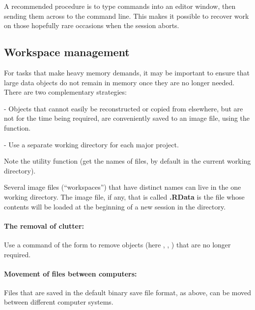 A recommended procedure
is to type commands into an editor window,
then sending them across to the command line. This makes it possible
to recover work on those hopefully rare occasions when the
session aborts.

\subsection{Workspace management}

For tasks that make heavy memory demands, it may be important to
ensure that large data objects do not remain in memory once they are
no longer needed. There are two complementary strategies:
\begin{itemizz}
\item[-] Objects that cannot easily be reconstructed or copied from elsewhere,
but are not for the time being required, are conveniently saved
to an image file, using the  function.

\item[-] Use a separate working directory for each major project.
\end{itemizz}

Note the utility function   (get the names of files, by
default in the current working directory).

Several image files (``workspaces'') that have distinct names can live
in the one working directory.  The image file, if any, that is called
\textbf{.RData} is the file whose contents will be loaded at the
beginning of a new session in the directory.

\paragraph{The removal of clutter:}

Use a command of the form   to remove
objects (here , , ) that are no longer
required.

\paragraph{Movement of files between computers:}\label{ss:dump}
Files that are saved in the default binary save file format, as above,
can be moved between different computer systems.

